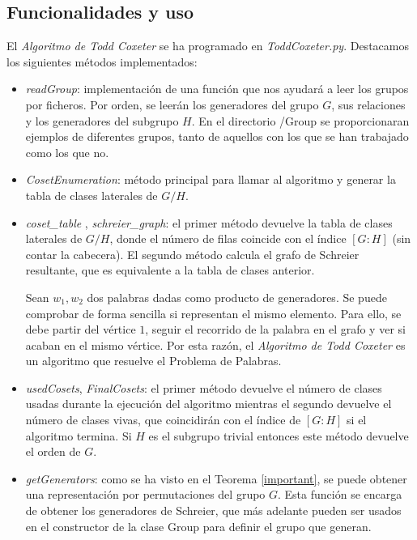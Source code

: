 \subsection{Funcionalidades y uso} \label{fyu}
El \textit{Algoritmo de Todd Coxeter} se ha programado en \textit{ToddCoxeter.py}. Destacamos los siguientes métodos implementados:
    \begin{itemize}
        \item \textit{readGroup}: implementación de una función que nos ayudará a leer los grupos por ficheros. Por orden, se leerán los generadores del grupo $G$, sus relaciones y los generadores del subgrupo $H$. En el directorio /Group se proporcionaran ejemplos de diferentes grupos, tanto de aquellos con los que se han trabajado como los que no.
        
        \item \textit{CosetEnumeration}: método principal para llamar al algoritmo y generar la tabla de clases laterales de $G/H$.
        
        \item \textit{coset\_table} , \textit{schreier\_graph}: el primer método devuelve la tabla de clases laterales de $G/H$, donde el número de filas coincide con el índice $[G:H]$ (sin contar la cabecera). El segundo método calcula el grafo de Schreier resultante, que es equivalente a la tabla de clases anterior.  
        
        Sean $w_1, w_2$  dos palabras dadas como producto de generadores. Se puede comprobar de forma sencilla si representan el mismo elemento. Para ello, se debe partir del vértice $1$, seguir el recorrido de la palabra en el grafo y ver si acaban en el mismo vértice. Por esta razón, el \textit{Algoritmo de Todd Coxeter} es un algoritmo que resuelve el Problema de Palabras.
        
                
        \item \textit{usedCosets}, \textit{FinalCosets}: el primer método devuelve el número de clases usadas durante la ejecución del algoritmo mientras el segundo devuelve el número de clases vivas, que coincidirán con el índice de $[G:H]$ si el algoritmo termina. Si $H$ es el subgrupo trivial entonces este método devuelve el orden de $G$.
        
        
        \item \textit{getGenerators}: como se ha visto en el Teorema \ref{important}, se puede obtener una representación por permutaciones del grupo $G$. Esta función se encarga de obtener los generadores de Schreier, que más adelante pueden ser usados en el constructor de la clase Group para definir el grupo que generan.
        
        

    \end{itemize}
    





